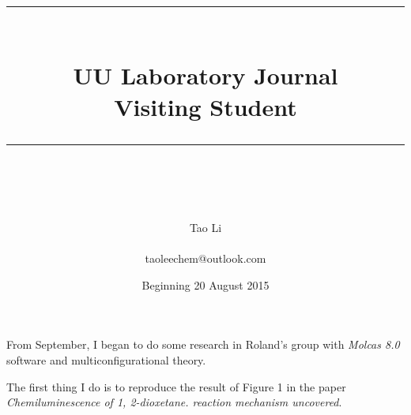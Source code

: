 \documentclass[idxtotoc,hyperref,openany]{labbook} %
\newcommand{\HRule}{\rule{\linewidth}{0.5mm}} %
\begin{document}

\frontmatter %
\title{
\begin{center}
\HRule \\[0.4cm]
{\Huge \bfseries UU Laboratory Journal \\[0.5cm] \Large Visiting Student}\\[0.4cm] %
\HRule \\[1.5cm]
\end{center}
}
\author{\Huge Tao Li \\ \\ \LARGE taoleechem@outlook.com \\[2cm]} %
\date{Beginning 20 August 2015} %
\maketitle

\tableofcontents

\mainmatter %











From September, I began to do some research in Roland's group with \textit{Molcas 8.0} software and multiconfigurational theory.\par

The first thing I do is to reproduce the result of Figure 1 in the paper \textit{Chemiluminescence of 1, 2-dioxetane. reaction mechanism uncovered}.\cite{de2007chemiluminescence}
\end{document}
